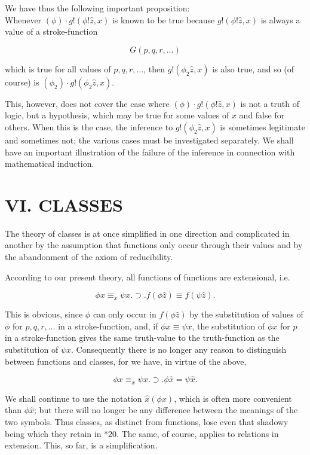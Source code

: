 \documentclass[10pt]{article}
\begin{document}
We have thus the following important proposition:\\
Whenever $(\phi) \cdot g!(\phi!\hat{z}, x)$ is known to be true because $g!(\phi!\hat{z}, x)$ is always a value of a stroke-function

$$
G(p, q, r, \ldots)
$$

which is true for all values of $p, q, r, \ldots$, then $g!\left(\phi_{2} \hat{z}, x\right)$ is also true, and so (of course) is $\left(\phi_{2}\right) \cdot g!\left(\phi_{2} \hat{z}, x\right)$.

This, however, does not cover the case where $(\phi) \cdot g!(\phi!\hat{z}, x)$ is not a truth of logic, but a hypothesis, which may be true for some values of $x$ and false for others. When this is the case, the inference to $g!\left(\phi_{2} \hat{z}, x\right)$ is sometimes legitimate and sometimes not; the various cases must be investigated separately. We shall have an important illustration of the failure of the inference in connection with mathematical induction.

\section*{VI. CLASSES}
The theory of classes is at once simplified in one direction and complicated in another by the assumption that functions only occur through their values and by the abandonment of the axiom of reducibility.

According to our present theory, all functions of functions are extensional, i.e.

$$
\phi x \equiv_{x} \psi x . \supset . f(\phi \hat{z}) \equiv f(\psi \hat{z}) .
$$

This is obvious, since $\phi$ can only occur in $f(\phi \hat{z})$ by the substitution of values of $\phi$ for $p, q, r, \ldots$ in a stroke-function, and, if $\phi x \equiv \psi x$, the substitution of $\phi x$ for $p$ in a stroke-function gives the same truth-value to the truth-function as the substitution of $\psi x$. Consequently there is no longer any reason to distinguish between functions and classes, for we have, in virtue of the above,

$$
\phi x \equiv_{x} \psi x . \supset . \phi \hat{x}=\psi \hat{x} .
$$

We shall continue to use the notation $\hat{x}(\phi x)$, which is often more convenient than $\phi \hat{x}$; but there will no longer be any difference between the meanings of the two symbols. Thus classes, as distinct from functions, lose even that shadowy being which they retain in $* 20$. The same, of course, applies to relations in extension. This, so far, is a simplification.
\end{document}
